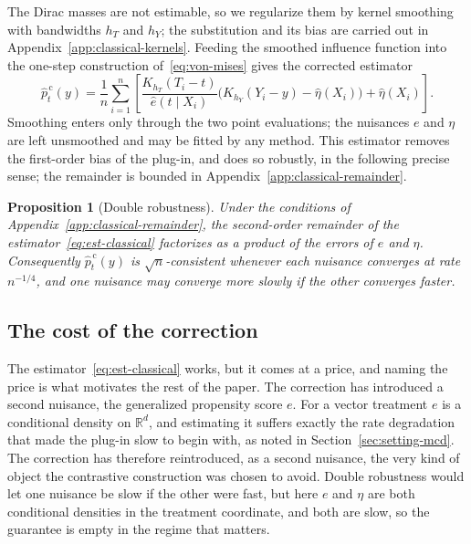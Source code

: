 \documentclass[11pt]{article}
\theoremstyle{plain}
\newtheorem{mypropo}{Proposition}
\theoremstyle{definition}
\theoremstyle{remark}
\newcommand{\R}{\mathbb{R}}
\newcommand{\gps}{e}
\begin{document}
The Dirac masses are not estimable, so we regularize them by kernel smoothing with bandwidths
$h_T$ and $h_Y$; the substitution and its bias are carried out in
Appendix~\ref{app:classical-kernels}. Feeding the smoothed influence function into the
one-step construction of~\eqref{eq:von-mises} gives the corrected estimator
\begin{equation}
\widehat p^{\,\mathrm{c}}_t(y)
= \frac{1}{n}\sum_{i=1}^{n}
\left[ \frac{K_{h_T}(T_i-t)}{\widehat\gps(t \mid X_i)}
\Big( K_{h_Y}(Y_i-y) - \widehat\eta(X_i) \Big)
+ \widehat\eta(X_i) \right].
\label{eq:est-classical}
\end{equation}
Smoothing enters only through the two point evaluations; the nuisances $\gps$ and $\eta$ are
left unsmoothed and may be fitted by any method. This estimator removes the first-order bias
of the plug-in, and does so robustly, in the following precise sense; the remainder is bounded
in Appendix~\ref{app:classical-remainder}.

\begin{mypropo}[Double robustness]
\label{prop:dr-classical}
Under the conditions of Appendix~\ref{app:classical-remainder}, the second-order remainder of
the estimator~\eqref{eq:est-classical} factorizes as a product of the errors of $\gps$ and
$\eta$. Consequently $\widehat p^{\,\mathrm{c}}_t(y)$ is $\sqrt{n}$-consistent whenever each
nuisance converges at rate $n^{-1/4}$, and one nuisance may converge more slowly if the other
converges faster.
\end{mypropo}

\subsection{The cost of the correction}
\label{sec:eif-cost}

The estimator~\eqref{eq:est-classical} works, but it comes at a price, and naming the price is
what motivates the rest of the paper. The correction has introduced a second nuisance, the
generalized propensity score $\gps$. For a vector treatment $\gps$ is a conditional density on
$\R^{d}$, and estimating it suffers exactly the rate degradation that made the plug-in slow to
begin with, as noted in Section~\ref{sec:setting-mcd}. The correction has therefore
reintroduced, as a second nuisance, the very kind of object the contrastive construction was
chosen to avoid. Double robustness would let one nuisance be slow if the other were fast, but
here $\gps$ and $\eta$ are both conditional densities in the treatment coordinate, and both
are slow, so the guarantee is empty in the regime that matters.
\end{document}
